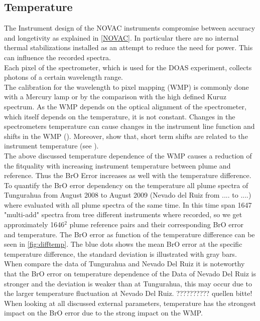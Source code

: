 \documentclass  [
  paper    = a4,
  BCOR     = 10mm,
  twoside,
  fontsize = 12pt,
  fleqn,
  toc      = bibnumbered,
  toc      = listofnumbered,
  numbers  = noendperiod,
  headings = normal,
  listof   = leveldown,
  version  = 3.03
]                                       {scrreprt}
\begin{document}
	\subsection{Temperature}
	The Instrument design of the NOVAC instruments compromise between accuracy and longetivity as explained in \cref{NOVAC}. In particular there are no internal thermal stabilizations installed as an attempt to reduce the need for power. This can influence the recorded spectra.\\	
	Each pixel of the spectrometer, which is used for the DOAS experiment, collects photons of a certain wavelength range.\\
	The calibration for the wavelength to pixel mapping (WMP) is commonly done with a Mercury lamp or by the comparison with the high defined Kuruz spectrum.
	As the WMP depends on the optical alignment of the spectrometer, which itself depends on the temperature, it is not constant.
	Changes in the spectrometers temperature can cause changes in the instrument line function and shifts in the WMP (\cite{pinardi2007influence}). 
	Moreover, \cite{WarnachSimon} show that, short term shifts are related to the instrument temperature (see ).\\
	The above discussed temperature dependence of the WMP causes a reduction of the fitquality with increasing instrument temperature between plume and reference. Thus the BrO Error increases as well with the temperature difference. To quantify the BrO error dependency on the temperature all plume spectra of Tungurahua from August 2008 to August 2009 (Nevado del Ruiz from .... to ....) where evaluated with all plume spectra of the same time. In this time span 1647 "multi-add" spectra from tree different instruments where recorded, so we get approximately 1646$^2$ plume reference pairs and their corresponding BrO error and temperature. The BrO error as function of the temperature difference can be seen in \cref{fig:difftemp}. The blue dots shows the mean BrO error at the specific temperature difference, the standard deviation is illustrated with gray bars.\\
	When compare the data of Tungurahua  and Nevado Del Ruiz it is noteworthy that the BrO error on temperature dependence of the Data of Nevado Del Ruiz is stronger and the deviation is weaker than at Tungurahua, this may occur due to the larger temperature fluctuation at Nevado Del Ruiz. ?????????? quellen bitte!\\
	When looking at all discussed external parameters, temperature has  the strongest impact on the BrO error due to the strong impact on the WMP.
\end{document}
